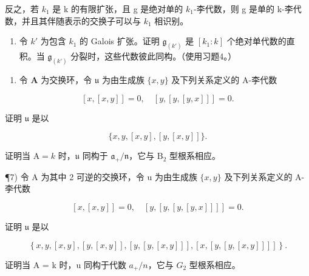 反之，若 \(k_{1}\) 是 k 的有限扩张，且 g 是绝对单的 \(k_{1}\)-李代数，则 g 是单的 k-李代数，并且其伴随表示的交换子可以与 \(k_{1}\) 相识别。

\begin{enumerate}
\def\labelenumi{\alph{enumi})}
\setcounter{enumi}{1}
\tightlist
\item
  令 \(k'\) 为包含 \(k_{1}\) 的 Galois 扩张。证明 \(\mathfrak{g}_{(k')}\) 是 \([k_{1}:k]\) 个绝对单代数的直积。当 \(\mathfrak{g}_{(k')}\) 分裂时，这些代数彼此同构。（使用习题4。）
\end{enumerate}

\begin{enumerate}
\def\labelenumi{\arabic{enumi})}
\setcounter{enumi}{5}
\tightlist
\item
  令 \(\mathbf{A}\) 为交换环，令 \(\mathfrak{u}\) 为由生成族 \(\{x, y\}\) 及下列关系定义的 A-李代数
\end{enumerate}

\[
[ x, [ x, y ] ] = 0, \quad [ y, [ y, [ y, x ] ] ] = 0.
\]

证明 \(\mathfrak{u}\) 是以

\[
\{x, y, [ x, y ], [ y, [ x, y ] ] \}.
\]

证明当 \(\mathrm{A} = k\) 时，\(\mathfrak{u}\) 同构于 \(\mathfrak{a}_{+} / \mathfrak{n}\)，它与 \(\mathrm{B}_2\) 型根系相应。

¶7) 令 A 为其中 2 可逆的交换环，令 u 为由生成族 \(\{x,y\}\) 及下列关系定义的 A-李代数

\[
[ x, [ x, y ] ] = 0, \quad [ y, [ y, [ y, [ y, x ] ] ] ] = 0.
\]

证明 \(\mathfrak{u}\) 是以

\[
\left. \right.\left\{x, y, [ x, y ], [ y, [ x, y ] ], [ y, [ y, [ x, y ] ] ], [ x, [ y, [ y, [ x, y ] ] ] ] \right\}.
\]

证明当 A = k 时，u 同构于代数 \(a_{+}/n\)，它与 \(G_{2}\) 型根系相应。


